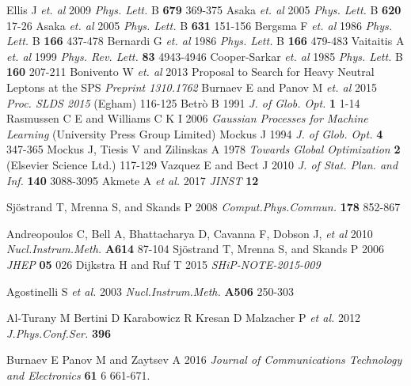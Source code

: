 \documentclass[a4paper]{jpconf}
\theoremstyle{my_theorem_style}
\numberwithin{equation}{section}
\begin{document}
\begin{thebibliography}{9}
 Ellis J {\it et. al} 2009 {\it Phys. Lett.} B {\bf679} 369-375
 Asaka  {\it et. al} 2005 {\it Phys. Lett.} B {\bf 620} 17-26
 Asaka {\it et. al} 2005 {\it Phys. Lett.} B {\bf 631} 151-156
 Bergsma F {\it et. al} 1986 {\it Phys. Lett.} B {\bf 166} 437-478
 Bernardi G {\it et. al} 1986 {\it Phys. Lett.} B {\bf 166} 479-483
 Vaitaitis A {\it et. al} 1999 {\it Phys. Rev. Lett.} {\bf 83} 4943-4946
 Cooper-Sarkar {\it et. al} 1985 {\it Phys. Lett.} B {\bf 160} 207-211
 Bonivento W {\it et. al} 2013 Proposal to Search for Heavy Neutral Leptons at the SPS {\it Preprint 1310.1762}
 Burnaev E and Panov M {\it et. al} 2015 {\it Proc. SLDS 2015} (Egham) 116-125
 Betr{\`o} B 1991 {\it J. of Glob. Opt.} {\bf 1} 1-14
 Rasmussen C E and Williams C K I 2006 {\it Gaussian Processes for Machine Learning} (University Press Group Limited)
 Mockus J 1994 {\it J. of Glob. Opt.} {\bf 4} 347-365
 Mockus J, Tiesis V and Zilinskas A 1978 {\it Towards Global Optimization} {\bf 2} (Elsevier Science Ltd.) 117-129
 Vazquez E and Bect J 2010 {\it J. of Stat. Plan. and Inf.} {\bf 140} 3088-3095
 Akmete A {\it et al.} 2017 {\it JINST} {\bf 12}

Sj\"{o}strand T, Mrenna S, and Skands P  2008
\emph{Comput.Phys.Commun.} \textbf{178} 852-867

Andreopoulos C, Bell A, Bhattacharya D, Cavanna F, Dobson J, {\it et al} 2010 \emph{Nucl.Instrum.Meth.} \textbf{A614} 87-104
Sj\"{o}strand T, Mrenna S, and Skands P 2006 \emph{JHEP} \textbf{05} 026
Dijkstra H and Ruf T 2015 {\it SHiP-NOTE-2015-009}

Agostinelli S {\it et al.} 2003 \emph{Nucl.Instrum.Meth.} \textbf{A506} 250-303

Al-Turany M Bertini D Karabowicz R Kresan D Malzacher P {\it et al.} 2012 \emph{J.Phys.Conf.Ser.} \textbf{396} 

 Burnaev E Panov M and Zaytsev A 2016 {\it Journal of Communications Technology and Electronics} {\bf 61} 6 661-671.
\end{thebibliography}


\appendix
\end{document}
